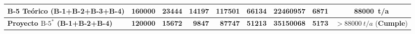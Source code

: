 \documentclass{report}
\begin{document}
\begin{table}[H]
{\begin{tabular}{l r r r r r r r c}
            B-5 Teórico (B-1+B-2+B-3+B-4)         & \num{160000}           & \num{23444}           & \num{14197}                 & \num{117501}               & \num{66134}                  & \num{22460957}                   & \num{6871}               & \SI{88000}{t/a}                  \\
            \midrule
            \textbf{Proyecto $\text{B-5}^*$ (B-1+B-2+B-4)} & \textbf{\num{120000}} & \textbf{\num{15672}} & \textbf{\num{9847}}         & \textbf{\num{87747}}       & \textbf{\num{51213}}         & \textbf{\num{35150068}}          & \textbf{\num{5173}}      & $> \SI{88000}{t/a}$ (\textbf{Cumple}) \\
            \bottomrule
        \end{tabular}%
    }
    \label{tab:escenarios_jafari}
\end{table}
\end{document}
